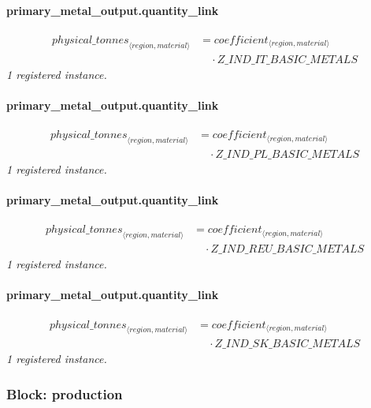 \documentclass[11pt]{article}
\begin{document}
\paragraph{primary\_metal\_output.quantity\_link}
\begin{align*}
{physical\_tonnes}_{\langle region, material\rangle} &= coefficient_{\langle region, material\rangle}\\
&\quad {}\cdot Z\_IND\_IT\_BASIC\_METALS
\end{align*}
\noindent\emph{1 registered instance.}\par
\paragraph{primary\_metal\_output.quantity\_link}
\begin{align*}
{physical\_tonnes}_{\langle region, material\rangle} &= coefficient_{\langle region, material\rangle}\\
&\quad {}\cdot Z\_IND\_PL\_BASIC\_METALS
\end{align*}
\noindent\emph{1 registered instance.}\par
\paragraph{primary\_metal\_output.quantity\_link}
\begin{align*}
{physical\_tonnes}_{\langle region, material\rangle} &= coefficient_{\langle region, material\rangle}\\
&\quad {}\cdot Z\_IND\_REU\_BASIC\_METALS
\end{align*}
\noindent\emph{1 registered instance.}\par
\paragraph{primary\_metal\_output.quantity\_link}
\begin{align*}
{physical\_tonnes}_{\langle region, material\rangle} &= coefficient_{\langle region, material\rangle}\\
&\quad {}\cdot Z\_IND\_SK\_BASIC\_METALS
\end{align*}
\noindent\emph{1 registered instance.}\par
\subsubsection*{Block: production}
\end{document}
